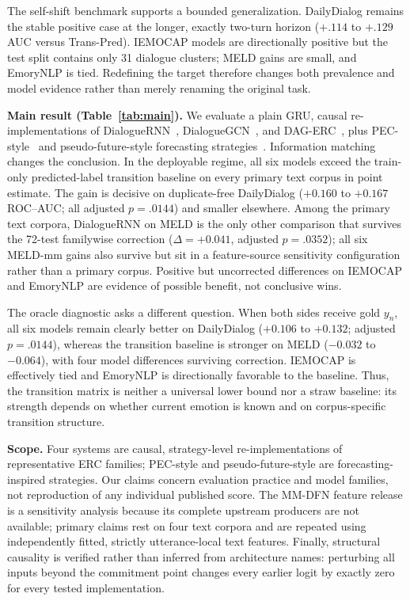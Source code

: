 \documentclass{ieeeaccess}
\begin{document}
The self-shift benchmark supports a bounded generalization. DailyDialog remains the stable positive
case at the longer, exactly two-turn horizon ($+.114$ to $+.129$ AUC versus Trans-Pred). IEMOCAP
models are directionally positive but the test split contains only 31 dialogue clusters; MELD gains
are small, and EmoryNLP is tied. Redefining the target therefore changes both prevalence and model
evidence rather than merely renaming the original task.

\textbf{Main result (Table~\ref{tab:main}).} We evaluate a plain GRU, causal re-implementations of
DialogueRNN~\cite{majumder2019dialoguernn}, DialogueGCN~\cite{ghosal2019dialoguegcn}, and
DAG-ERC~\cite{shen2021dagerc}, plus PEC-style~\cite{altarawneh2023pec} and pseudo-future-style
forecasting strategies~\cite{xie2025pugcn}. Information matching changes the conclusion. In the
deployable regime, all six models exceed the train-only predicted-label transition baseline on
every primary text corpus in point estimate. The gain is decisive on duplicate-free DailyDialog
($+0.160$ to $+0.167$ ROC--AUC; all adjusted $p=.0144$) and smaller elsewhere. Among the primary
text corpora, DialogueRNN on MELD is the only other comparison that survives the 72-test
familywise correction ($\Delta=+0.041$, adjusted $p=.0352$); all six MELD-mm gains also survive
but sit in a feature-source sensitivity configuration rather than a primary corpus. Positive but
uncorrected differences on IEMOCAP and EmoryNLP are evidence of possible benefit, not conclusive
wins.

The oracle diagnostic asks a different question. When both sides receive gold $y_n$, all six
models remain clearly better on DailyDialog ($+0.106$ to $+0.132$; adjusted $p=.0144$), whereas
the transition baseline is stronger on MELD ($-0.032$ to $-0.064$), with four model differences
surviving correction. IEMOCAP is effectively tied and EmoryNLP is directionally favorable to the
baseline. Thus, the transition matrix is neither a universal lower bound nor a straw baseline:
its strength depends on whether current emotion is known and on corpus-specific transition
structure.

\textbf{Scope.} Four systems are causal, strategy-level re-implementations of representative ERC
families; PEC-style and pseudo-future-style are forecasting-inspired strategies. Our claims concern
evaluation practice and model families, not reproduction of any individual published score. The
MM-DFN feature release is a sensitivity analysis because its complete upstream producers are not
available; primary claims rest on four text corpora and are repeated using independently fitted,
strictly utterance-local text features. Finally, structural causality is verified rather than
inferred from architecture names: perturbing all inputs beyond the commitment point changes every
earlier logit by exactly zero for every tested implementation.
\end{document}
